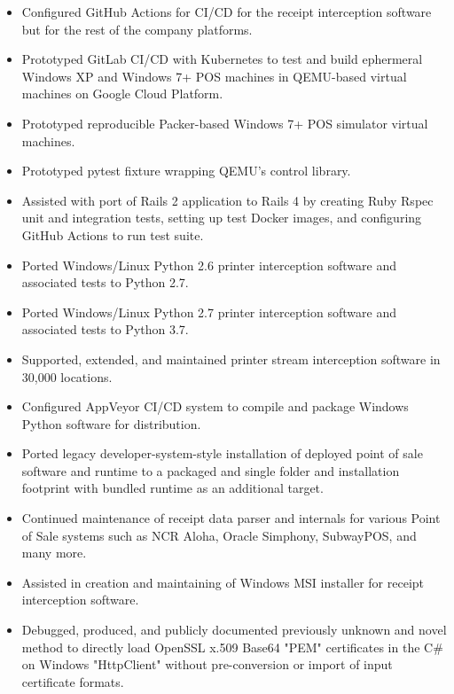 \documentclass[10pt,letter,ragged2e]{altacv}
\begin{document}
\begin{paracol}{2}


\begin{itemize}
\item Configured GitHub Actions for CI/CD for the receipt interception software but for the rest of the company platforms.
\item Prototyped GitLab CI/CD with Kubernetes to test and build ephermeral Windows XP and Windows 7+ POS machines in QEMU-based virtual machines on Google Cloud Platform. 
\item Prototyped reproducible Packer-based Windows 7+ POS simulator virtual machines.
\item Prototyped pytest fixture wrapping QEMU's control library. 
\item Assisted with port of Rails 2 application to Rails 4 by creating Ruby Rspec unit and integration tests, setting up test Docker images, and configuring GitHub Actions to run test suite.
\item Ported Windows/Linux Python 2.6 printer interception software and associated tests to Python 2.7.
\item Ported Windows/Linux Python 2.7 printer interception software and associated tests to Python 3.7.
\item Supported, extended, and maintained printer stream interception software in 30,000 locations.
\item Configured AppVeyor CI/CD system to compile and package Windows Python software for distribution.
\item Ported legacy developer-system-style installation of deployed point of sale software and runtime to a packaged and single folder and installation footprint with bundled runtime as an additional target.
\item Continued maintenance of receipt data parser and internals for various Point of Sale systems such as NCR Aloha, Oracle Simphony, SubwayPOS, and many more.
\item Assisted in creation and maintaining of Windows MSI installer for receipt interception software.
\item Debugged, produced, and publicly documented previously unknown and novel method to directly load OpenSSL x.509 Base64 "PEM" certificates in the C\# on Windows "HttpClient" without pre-conversion or import of input certificate formats.

\end{itemize}
\end{paracol}
\end{document}
